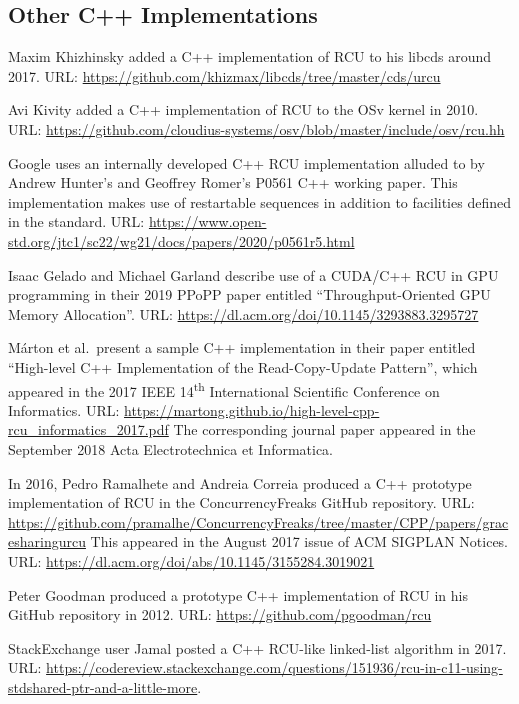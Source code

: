 \subsection{Other C++ Implementations}
\label{sec:Other C++ Implementations}

Maxim Khizhinsky added a C++ implementation of RCU to his libcds
around 2017.
URL: \url{https://github.com/khizmax/libcds/tree/master/cds/urcu}

Avi Kivity added a C++ implementation of RCU to the OSv kernel in
2010.
URL: \url{https://github.com/cloudius-systems/osv/blob/master/include/osv/rcu.hh}

Google uses an internally developed C++ RCU implementation alluded to by
Andrew Hunter's and Geoffrey Romer's P0561 C++ working paper.
This implementation makes use of restartable sequences in addition to
facilities defined in the standard.
URL: \url{https://www.open-std.org/jtc1/sc22/wg21/docs/papers/2020/p0561r5.html}

Isaac Gelado and Michael Garland describe use of a CUDA/C++ RCU in GPU
programming in their 2019 PPoPP paper entitled ``Throughput-Oriented
GPU Memory Allocation''.
URL: \url{https://dl.acm.org/doi/10.1145/3293883.3295727}

M\'arton et al.~present a sample C++ implementation in their paper
entitled ``High-level C++ Implementation of the Read-Copy-Update
Pattern'', which appeared in the 2017 IEEE 14\textsuperscript{th}
International Scientific Conference on Informatics.
URL: \url{https://martong.github.io/high-level-cpp-rcu_informatics_2017.pdf}
The corresponding journal paper appeared in the September 2018 Acta
Electrotechnica et Informatica.

In 2016, Pedro Ramalhete and Andreia Correia produced a C++ prototype
implementation of RCU in the ConcurrencyFreaks GitHub repository.
URL: \url{https://github.com/pramalhe/ConcurrencyFreaks/tree/master/CPP/papers/gracesharingurcu}
This appeared in the August 2017 issue of ACM SIGPLAN Notices.
URL: \url{https://dl.acm.org/doi/abs/10.1145/3155284.3019021}

Peter Goodman produced a prototype C++ implementation of RCU in his
GitHub repository in 2012.
URL: \url{https://github.com/pgoodman/rcu}

StackExchange user Jamal posted a C++ RCU-like linked-list algorithm
in 2017.
URL: \url{https://codereview.stackexchange.com/questions/151936/rcu-in-c11-using-stdshared-ptr-and-a-little-more}.

